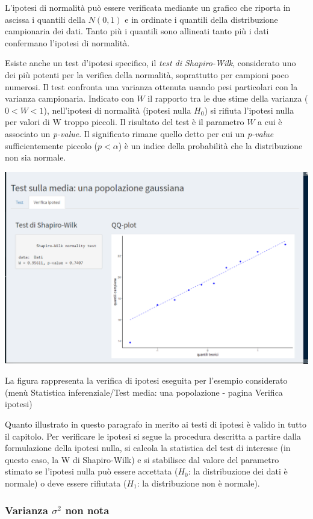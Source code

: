 \documentclass[
  11pt,
]{book}
\begin{document}
L'ipotesi di normalità può essere verificata mediante un grafico che riporta in ascissa i quantili della \(N (0 , 1)\) e in ordinate i quantili della distribuzione campionaria dei dati. Tanto più i quantili sono allineati tanto più i dati confermano l'ipotesi di normalità.

Esiste anche un test d'ipotesi specifico, il \emph{test di Shapiro-Wilk}, considerato uno dei più potenti per la verifica della normalità, soprattutto per campioni poco numerosi. Il test confronta una varianza ottenuta usando pesi particolari con la
varianza campionaria. Indicato con \(W\) il rapporto tra le due stime della varianza (\(0 < W < 1\)), nell'ipotesi di
normalità (ipotesi nulla \(H_0\)) si rifiuta l'ipotesi nulla per valori di W troppo piccoli. Il risultato del test è il parametro \(W\) a cui è associato un \emph{p-value}. Il significato rimane quello detto per cui un \emph{p-value} sufficientemente piccolo
(\(p < \alpha\)) è un indice della probabilità che la distribuzione non sia normale.

\begin{center}\includegraphics[width=0.5\linewidth]{Immagini/Inferenziale/test_ip_verfipo} \end{center}

La figura rappresenta la verifica di ipotesi eseguita per l'esempio considerato (menù Statistica inferenziale/Test media: una popolazione - pagina Verifica ipotesi)

Quanto illustrato in questo paragrafo in merito ai testi di ipotesi è valido in tutto il capitolo. Per verificare le ipotesi si segue la procedura descritta a partire dalla formulazione della ipotesi nulla, si calcola la statistica del test di interesse (in questo caso, la W di Shapiro-Wilk) e si stabilisce dal valore del parametro stimato se l'ipotesi nulla può essere accettata (\(H_0\): la distribuzione dei dati è normale) o deve essere rifiutata (\(H_1\): la distribuzione non è normale).

\hypertarget{varianza-sigma2-non-nota}{%
\subsubsection{\texorpdfstring{Varianza \(\sigma^2\) non nota}{Varianza \textbackslash sigma\^{}2 non nota}}\label{varianza-sigma2-non-nota}}
\end{document}
